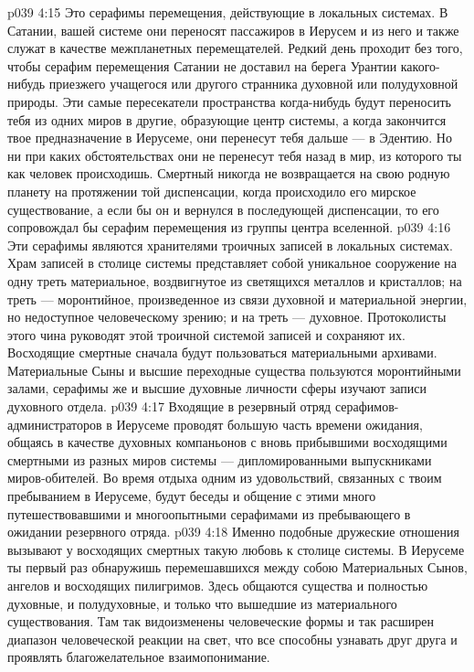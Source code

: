 \vs p039 4:15 \pc {}\bibnobreakspace {} Это серафимы перемещения, действующие в локальных системах. В Сатании, вашей системе они переносят пассажиров в Иерусем и из него и также служат в качестве межпланетных перемещателей. Редкий день проходит без того, чтобы серафим перемещения Сатании не доставил на берега Урантии какого\hyp{}нибудь приезжего учащегося или другого странника духовной или полудуховной природы. Эти самые пересекатели пространства когда\hyp{}нибудь будут переносить тебя из одних миров в другие, образующие центр системы, а когда закончится твое предназначение в Иерусеме, они перенесут тебя дальше --- в Эдентию. Но ни при каких обстоятельствах они не перенесут тебя назад в мир, из которого ты как человек происходишь. Смертный никогда не возвращается на свою родную планету на протяжении той диспенсации, когда происходило его мирское существование, а если бы он и вернулся в последующей диспенсации, то его сопровождал бы серафим перемещения из группы центра вселенной.
\vs p039 4:16 \pc {}\bibnobreakspace {} Эти серафимы являются хранителями троичных записей в локальных системах. Храм записей в столице системы представляет собой уникальное сооружение на одну треть материальное, воздвигнутое из светящихся металлов и кристаллов; на треть --- моронтийное, произведенное из связи духовной и материальной энергии, но недоступное человеческому зрению; и на треть --- духовное. Протоколисты этого чина руководят этой троичной системой записей и сохраняют их. Восходящие смертные сначала будут пользоваться материальными архивами. Материальные Сыны и высшие переходные существа пользуются моронтийными залами, серафимы же и высшие духовные личности сферы изучают записи духовного отдела.
\vs p039 4:17 \pc {}\bibnobreakspace {} Входящие в резервный отряд серафимов\hyp{}администраторов в Иерусеме проводят большую часть времени ожидания, общаясь в качестве духовных компаньонов с вновь прибывшими восходящими смертными из разных миров системы --- дипломированными выпускниками миров\hyp{}обителей. Во время отдыха одним из удовольствий, связанных с твоим пребыванием в Иерусеме, будут беседы и общение с этими много путешествовавшими и многоопытными серафимами из пребывающего в ожидании резервного отряда.
\vs p039 4:18 Именно подобные дружеские отношения вызывают у восходящих смертных такую любовь к столице системы. В Иерусеме ты первый раз обнаружишь перемешавшихся между собою Материальных Сынов, ангелов и восходящих пилигримов. Здесь общаются существа и полностью духовные, и полудуховные, и только что вышедшие из материального существования. Там так видоизменены человеческие формы и так расширен диапазон человеческой реакции на свет, что все способны узнавать друг друга и проявлять благожелательное взаимопонимание.
